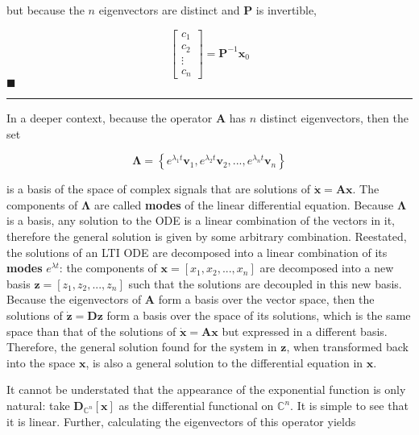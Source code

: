 	but because the $n$ eigenvectors are distinct and $\mathbf{P}$ is invertible,

\begin{equation} \left[\begin{array}{c} c_1 \\[3mm] c_2 \\[3mm] \vdots \\[3mm] c_n \end{array}\right] = \mathbf{P}^{-1}\mathbf{x}_0 \end{equation}
\hfill$\blacksquare$
\vspace{5mm}
\hrule
\vspace{5mm} %

	In a deeper context, because the operator $\mathbf{A}$ has $n$ distinct eigenvectors, then the set

\begin{equation} \boldsymbol{\Lambda} = \left\{e^{\lambda_1 t}\mathbf{v}_1,e^{\lambda_2 t}\mathbf{v}_2,...,e^{\lambda_n t}\mathbf{v}_n\right\} \end{equation}

	 \noindent is a basis of the space of complex signals that are solutions of $\dot{\mathbf{x}} = \mathbf{Ax}$. The components of $\boldsymbol{\Lambda}$ are called \textbf{modes} of the linear differential equation. Because $\boldsymbol{\Lambda}$ is a basis, any solution to the ODE is a linear combination of the vectors in it, therefore the general solution is given by some arbitrary combination. Reestated, the solutions of an LTI ODE are decomposed into a linear combination of its \textbf{modes} $e^{\lambda t}$: the components of $\mathbf{x} = \left[x_1,x_2,...,x_n\right]$ are decomposed into a new basis $\mathbf{z} = \left[z_1,z_2,...,z_n\right]$ such that the solutions are decoupled in this new basis. Because the eigenvectors of $\mathbf{A}$ form a basis over the vector space, then the solutions of $\dot{\mathbf{z}} = \mathbf{Dz}$ form a basis over the space of its solutions, which is the same space than that of the solutions of $\dot{\mathbf{x}} = \mathbf{Ax}$ but expressed in a different basis. Therefore, the general solution found for the system in $\mathbf{z}$, when transformed back into the space $\mathbf{x}$, is also a general solution to the differential equation in $\mathbf{x}$.

	It cannot be understated that the appearance of the exponential function is only natural: take $\mathbf{D}_{\mathbb{C}^n} \left[\mathbf{x}\right]$ as the differential functional on $\mathbb{C}^n$. It is simple to see that it is linear. Further, calculating the eigenvectors of this operator yields

